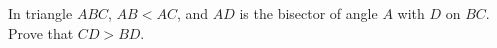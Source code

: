 In triangle \(ABC\), \(AB<AC\), and \(AD\) is the bisector of angle \(A\) with \(D\) on \(BC\). Prove that \(CD>BD\).
